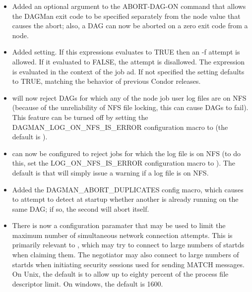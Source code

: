 \begin{itemize}

\item Added an optional argument to the  ABORT-DAG-ON
command that allows the DAGMan exit code to be specified separately
from the node value that causes the abort; also, a DAG can now be
aborted on a zero exit code from a node.

\item Added  setting.  If this expressions evaluates to
TRUE then an  -f attempt is allowed.  If it evaluated to FALSE, the
attempt is disallowed.  The expression is evaluated in the context of the job
ad.  If not specified the setting defaults to TRUE, matching the behavior of
previous Condor releases.

\item {} will now reject DAGs for which any of the node
job user log files are on NFS (because of the unreliability of NFS
file locking, this can cause DAGs to fail).  This feature can be
turned off by setting the DAGMAN\_LOG\_ON\_NFS\_IS\_ERROR configuration
macro to  (the default is ).

\item {} can now be configured to reject jobs for which
the log file is on NFS (to do this, set the LOG\_ON\_NFS\_IS\_ERROR
configuration macro to ).  The default is that 
will simply issue a warning if a log file is on NFS.

\item Added the DAGMAN\_ABORT\_DUPLICATES config macro, which causes
 to attempt to detect at startup whether another
 is already running on the same DAG; if so, the second
 will abort itself.

\item There is now a configuration paramater
 that may be used to limit the
maximum number of simultaneous network connection attempts.  This is
primarily relevant to , which may try to connect to
large numbers of startds when claiming them.  The negotiator may also
connect to large numbers of startds when initiating security sessions
used for sending MATCH messages.  On Unix, the default is to allow up to
eighty percent of the process file descriptor limit.  On windows, the
default is 1600.

\end{itemize}

